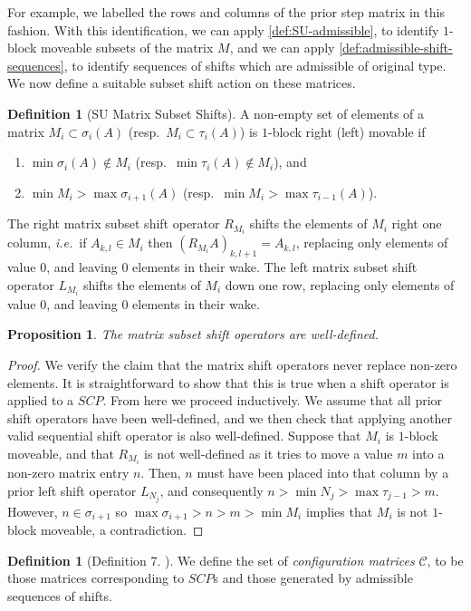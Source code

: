 \documentclass{amsart}
\newtheorem{proposition}[theorem]{Proposition}
\theoremstyle{definition}
\newtheorem{definition}[theorem]{Definition}
\newcommand{\ie}{\textit{i.e.}~} %
\newcommand{\resp}{resp.~} %
\begin{document}
For example, we labelled the rows and columns of the prior step matrix in this fashion.
With this identification, we can apply \cref{def:SU-admissible}, to identify $1$-block moveable subsets of the matrix $M$, and we can apply \cref{def:admissible-shift-sequences}, to identify sequences of shifts which are admissible of original type.
We now define a suitable subset shift action on these matrices.
\begin{definition} [SU Matrix Subset Shifts]
A non-empty set of elements of a matrix $M_i \subset \sigma_i(A)$ (\resp $M_{i}\subset \tau_{i}(A)$) is $1$-block right (left) movable if
\begin{enumerate}
	\item $\min \sigma_i(A) \notin M_i$ (\resp $\min \tau_{i}(A) \notin M_i$), and
	\item $\min M_i> \max \sigma_{i+1}(A)$ (\resp $\min M_{i}> \max \tau_{i-1}(A)$).
\end{enumerate}
The right matrix subset shift operator $R_{M_i}$ shifts the elements of $M_i$ right one column, \ie if $A_{k,l} \in M_i$ then $(R_{M_i}A)_{k,l+1} = A_{k,l}$, replacing only elements of value $0$, and leaving $0$ elements in their wake.
The left matrix subset shift operator $L_{M_i}$ shifts the elements of $M_i$ down one row, replacing only elements of value $0$, and leaving $0$ elements in their wake.
\end{definition}
\begin{proposition}
The matrix subset shift operators are well-defined.
\end{proposition}
\begin{proof}
We verify the claim that the matrix shift operators never replace non-zero elements.
It is straightforward to show that this is true when a shift operator is applied to a $SCP$.
From here we proceed inductively.
We assume that all prior shift operators have been well-defined, and we then check that applying another valid sequential shift operator is also well-defined.
Suppose that $M_i$ is $1$-block moveable, and that $R_{M_i}$ is not well-defined as it tries to move a value $m$ into a non-zero matrix entry $n$.
Then, $n$ must have been placed into that column by a prior left shift operator $L_{N_j}$, and consequently $n>\min N_j > \max \tau_{j-1}> m$.
However, $n\in \sigma_{i+1}$ so $\max \sigma_{i+1}>n>m>\min M_i $ implies that $M_i$ is not $1$-block moveable, a contradiction.
\end{proof}


\begin{definition}[Definition 7. \cite{SaneblidzeUmble}]
We define the set of \emph{configuration matrices} $\mathcal{C}$, to be those matrices  corresponding to $SCP$s and those generated by admissible sequences of shifts.
\end{definition}
\end{document}
